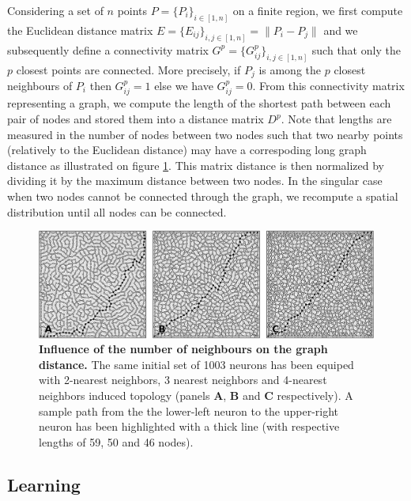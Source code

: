 Considering a set of $n$ points $P = \{P_i\}_{i \in [1,n]}$ on a finite region,
we first compute the Euclidean distance matrix $E = \{E_{ij}\}_{i,j \in [1,n]}
= \lVert P_i - P_j \rVert$ and we subsequently define a connectivity matrix
$G^{p} = \{G^{p}_{ij}\}_{i,j \in [1,n]}$ such that only the $p$ closest points
are connected. More precisely, if $P_j$ is among the $p$ closest neighbours of
$P_i$ then $G^p_{ij} = 1$ else we have $G^p_{ij} = 0$. From this connectivity
matrix representing a graph, we compute the length of the shortest path between
each pair of nodes and stored them into a distance matrix $D^p$. Note that
lengths are measured in the number of nodes between two nodes such that two
nearby points (relatively to the Euclidean distance) may have a correspoding
long graph distance as illustrated on figure \ref{fig:topology}. This matrix
distance is then normalized by dividing it by the maximum distance between two
nodes. In the singular case when two nodes cannot be connected through the
graph, we recompute a spatial distribution until all nodes can be connected.
\begin{figure}
  \includegraphics[width=\columnwidth]{figures/distances.pdf}
  \caption{\textbf{Influence of the number of neighbours on the graph
    distance.} The same initial set of 1003 neurons has been equiped with
    2-nearest neighbors, 3 nearest neighbors and 4-nearest neighbors induced
    topology (panels \textbf{A}, \textbf{B} and \textbf{C} respectively). A
    sample path from the the lower-left neuron to the upper-right neuron has
    been highlighted with a thick line (with respective lengths of 59, 50 and
    46 nodes).}
  \label{fig:topology}
\end{figure}


\subsection{Learning}

